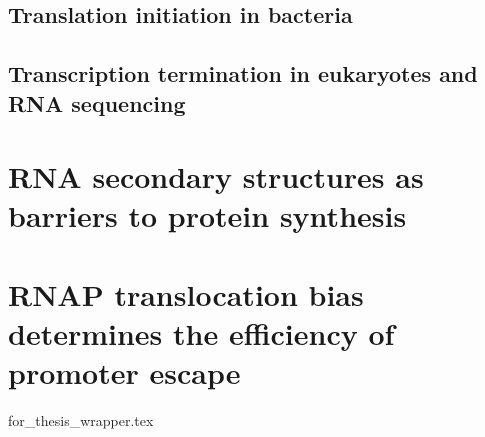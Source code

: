 \documentclass[]{ntnuthesis}
\begin{document}
\section{Translation initiation in bacteria}
\begin{refsection}

\printbibliography
\end{refsection}
\newpage

\section{Transcription termination in eukaryotes and RNA sequencing}



\printbibliography  %
\newpage


\chapter{RNA secondary structures as barriers to protein synthesis}
\begin{refsection}
\label{chap:celB}

\printbibliography
\end{refsection}

\chapter{RNAP translocation bias determines the efficiency of promoter escape}
\label{chap:initiation_paper}
{for_thesis_wrapper.tex}
\end{document}
